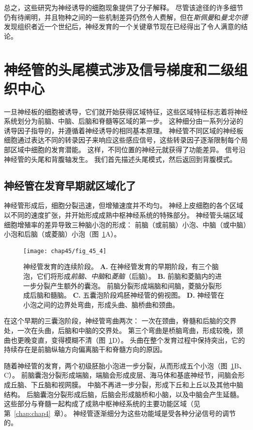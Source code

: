 总之，这些研究为神经诱导的细胞现象提供了分子解释。
尽管该途径的许多细节仍有待阐明，并且物种之间的一些机制差异仍然令人费解，但在\textit{斯佩曼}和\textit{曼戈尔德}发现组织者近一个世纪后，神经发育的一个关键章节现在已经得出了令人满意的结论。



\section{神经管的头尾模式涉及信号梯度和二级组织中心}

一旦神经板的细胞被诱导，它们就开始获得区域特征，这些区域特征标志着将神经系统划分为前脑、中脑、后脑和脊髓等区域的第一步。
这种细分由一系列分泌的诱导因子指导的，并遵循着神经诱导的相同基本原理。
神经管不同区域的神经板细胞通过表达不同的转录因子来响应这些感应信号，这些转录因子逐渐限制每个局部区域中细胞的发育潜能。
这样，不同位置的神经元就获得了功能差异。
信号沿神经管的头尾和背腹轴发生。
我们首先描述头尾模式，然后返回到背腹模式。



\subsection{神经管在发育早期就区域化了}

神经管形成后，细胞分裂迅速，但增殖速度并不均匀。
神经上皮细胞的各个区域以不同的速度扩张，并开始形成成熟中枢神经系统的特殊部分。
神经管头端区域细胞增殖率的差异导致三种脑小泡的形成：
前脑（或前脑）小泡、中脑（或中脑）小泡和后脑（或菱脑）小泡（图~\ref{fig:45_4}A）。


\begin{figure}[htbp]
	\centering
	\texttt{[image: chap45/fig\_45\_4]}
	\caption{神经管发育的连续阶段。
		\textbf{A.} 在神经管发育的早期阶段，有三个脑泡，它们将形成\textit{前脑}、\textit{中脑}和\textit{菱脑}（后脑）。
		\textbf{B.} 前脑和菱脑内的进一步分裂产生额外的囊泡。
		前脑分裂形成端脑和间脑，菱脑分裂形成后脑和髓脑。
		\textbf{C.} 五囊泡阶段鸡胚神经管的俯视图。
		\textbf{D.} 神经管在小泡之间的边界处弯曲，形成头曲、脑桥曲和颈曲。}
	\label{fig:45_4}
\end{figure}


在这个早期的三囊泡阶段，神经管弯曲两次：
一次在颈曲，脊髓和后脑的交界处，一次在头曲，后脑和中脑的交界处。
第三个弯曲是桥脑弯曲，形成较晚，颈曲也更晚变直，变得模糊不清（图~\ref{fig:45_4}D）。
头曲在整个发育过程中保持突出，它的持续存在是前脑纵轴方向偏离脑干和脊髓方向的原因。


随着神经管的发育，两个初级胚胎小泡进一步分裂，从而形成五个小泡（图~\ref{fig:45_4}B、C）。
前脑囊泡分裂形成端脑，端脑会形成皮层、海马体和基底神经节，间脑会形成丘脑、下丘脑和视网膜。
中脑不再进一步分裂，形成下丘和上丘以及其他中脑结构。
后脑囊泡分裂形成后脑，后脑会形成脑桥和小脑，以及中脑会产生延髓。
这些部分与脊髓一起构成了成熟中枢神经系统的主要功能区域（见第~\ref{chap:chap4}~章）。
神经管逐渐细分为这些功能域是受各种分泌信号的调节的。



